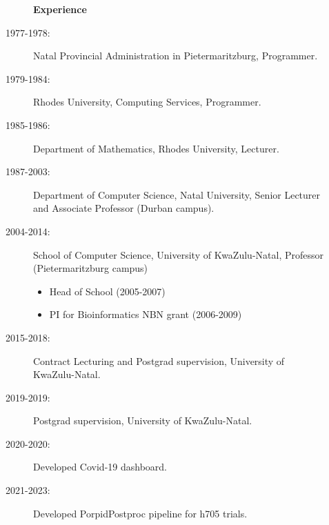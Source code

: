\documentclass[12pt]{article}
\begin{document}
\begin{multicols}{2}
\begin{description}
\item[] \begin{description}
\item[] {\large \bf Experience}
\item[1977-1978:]
Natal Provincial Administration in Pietermaritzburg, Programmer. 
\item[1979-1984:]
Rhodes University, Computing Services, Programmer.  
\item[1985-1986:]
Department of Mathematics, Rhodes University, Lecturer. 
\item[1987-2003:]
Department of Computer Science, Natal University, \newline
Senior Lecturer and Associate Professor (Durban campus). 
\item[2004-2014:]
School of Computer Science, University of KwaZulu-Natal,  \newline
Professor (Pietermaritzburg campus)
\begin{itemize}
\item  Head of School (2005-2007)
\item  PI for Bioinformatics NBN grant (2006-2009)
\end{itemize}
\item[2015-2018:]
Contract Lecturing and Postgrad supervision, University of KwaZulu-Natal.
\item[2019-2019:]
Postgrad supervision, University of KwaZulu-Natal.
\item[2020-2020:]
Developed Covid-19 dashboard.
\item[2021-2023:]
Developed PorpidPostproc pipeline for h705 trials.
\end{description}
\end{description}

\end{multicols}
\end{document}
